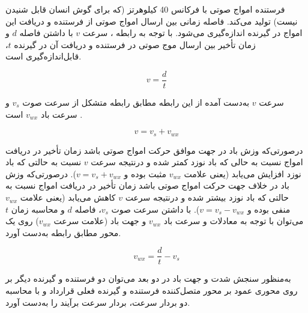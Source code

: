 فرستنده امواج صوتی با فرکانس 40 کیلوهرتز (که برای گوش انسان قابل شنیدن نیست) تولید می‌کند. فاصله زمانی بین ارسال امواج صوتی از فرستنده و دریافت این امواج در گیرنده اندازه‌گیری می‌شود. با توجه به رابطه ، سرعت $v$ با داشتن فاصله $d$ و زمان تأخیر بین ارسال موج صوتی در فرستنده و دریافت آن در گیرنده  $t$، قابل‌اندازه‌گیری است.

\begin{equation}\label{eq:speed}
	v = \frac{d}{t}
\end{equation}

سرعت $v$ به‌دست آمده از این رابطه مطابق رابطه  متشکل از سرعت صوت $v_s$ و سرعت باد $v_{wx}$  است .

\begin{equation}\label{eq:expandSpeed}
	v = v_s + v_{wx}
\end{equation}

درصورتی‌که وزش باد در جهت موافق حرکت امواج صوتی باشد زمان تأخیر در دریافت امواج نسبت به حالی که باد نوزد کمتر شده و درنتیجه سرعت $v$ نسبت به حالتی که باد نوزد افزایش می‌یابد (یعنی علامت $v_{wx}$ مثبت بوده و $v = v_s+v_{wx}$). درصورتی‌که وزش باد در خلاف جهت حرکت امواج صوتی باشد زمان تأخیر در دریافت امواج نسبت به حالتی که باد نوزد بیشتر شده و درنتیجه سرعت $v$ کاهش می‌یابد (یعنی علامت $v_{wx}$ منفی بوده و $v = v_s-v_{wx}$). با داشتن سرعت صوت $v_s$، فاصله $d$ و محاسبه زمان $t$ می‌توان با توجه به معادلات  و  سرعت باد $v_{wx}$ و جهت باد (علامت سرعت $v_{wx}$) روی یک محور مطابق رابطه  به‌دست آورد. 

\begin{equation}\label{eq:speedWindX}
	v_{wx} = \frac{d}{t} - v_s
\end{equation}

به‌منظور سنجش شدت و جهت باد در دو بعد می‌توان دو فرستنده و گیرنده دیگر بر روی محوری عمود بر محور متصل‌کننده فرستنده و گیرنده فعلی قرارداد و با محاسبه دو بردار سرعت، بردار سرعت برآیند را به‌دست آورد.

